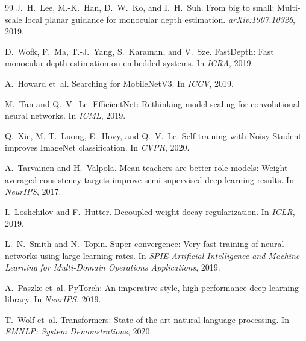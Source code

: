 \documentclass[11pt]{article}
\begin{document}
\begin{thebibliography}{99}
J.~H.~Lee, M.-K.~Han, D.~W.~Ko, and I.~H.~Suh.
From big to small: Multi-scale local planar guidance for monocular depth estimation.
\emph{arXiv:1907.10326}, 2019.

D.~Wofk, F.~Ma, T.-J.~Yang, S.~Karaman, and V.~Sze.
FastDepth: Fast monocular depth estimation on embedded systems.
In \emph{ICRA}, 2019.

A.~Howard et~al.
Searching for MobileNetV3.
In \emph{ICCV}, 2019.

M.~Tan and Q.~V.~Le.
EfficientNet: Rethinking model scaling for convolutional neural networks.
In \emph{ICML}, 2019.

Q.~Xie, M.-T.~Luong, E.~Hovy, and Q.~V.~Le.
Self-training with Noisy Student improves ImageNet classification.
In \emph{CVPR}, 2020.

A.~Tarvainen and H.~Valpola.
Mean teachers are better role models: Weight-averaged consistency targets improve semi-supervised
deep learning results.
In \emph{NeurIPS}, 2017.

I.~Loshchilov and F.~Hutter.
Decoupled weight decay regularization.
In \emph{ICLR}, 2019.

L.~N.~Smith and N.~Topin.
Super-convergence: Very fast training of neural networks using large learning rates.
In \emph{SPIE Artificial Intelligence and Machine Learning for Multi-Domain Operations
Applications}, 2019.

A.~Paszke et~al.
PyTorch: An imperative style, high-performance deep learning library.
In \emph{NeurIPS}, 2019.

T.~Wolf et~al.
Transformers: State-of-the-art natural language processing.
In \emph{EMNLP: System Demonstrations}, 2020.

\end{thebibliography}
\end{document}

